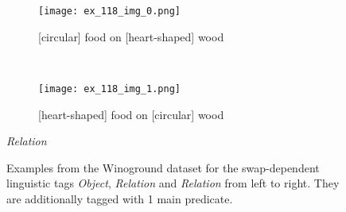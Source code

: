 \begin{figure}[ht]
\begin{minipage}[t]{.30\textwidth}
\begin{subfigure}[t]{\textwidth}
        \texttt{[image: ex\_118\_img\_0.png]}
        \caption{[circular] food on [heart-shaped] wood}
        \end{subfigure}\\
        \begin{subfigure}[t]{\textwidth}
        \centering
        \texttt{[image: ex\_118\_img\_1.png]}
        \caption{[heart-shaped] food on [circular] wood}
        \end{subfigure}%
        \caption*{\textit{Relation}}
    \end{minipage}%
    \caption{Examples from the Winoground dataset for the swap-dependent linguistic tags \textit{Object}, \textit{Relation} and \textit{Relation} from left to right. They are additionally tagged with 1 main predicate.}
    \label{fig:winoground-examples}
\end{figure}

